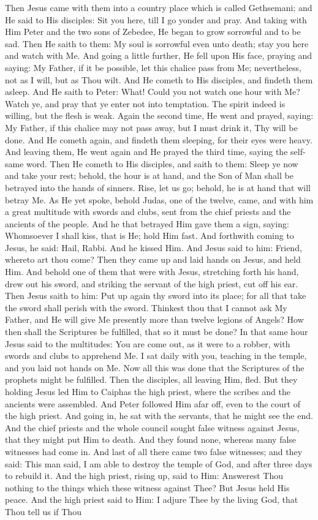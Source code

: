 {{Then Jesus came with them into a country place which is called Gethsemani; and He said to His disciples: Sit you here, till I go yonder and pray. And taking with Him Peter and the two sons of Zebedee, He began to grow sorrowful and to be sad. Then He saith to them: My soul is sorrowful even unto death; stay you here and watch with Me. And going a little further, He fell upon His face, praying and saying: My Father, if it be possible, let this chalice pass from Me; nevertheless, not as I will, but as Thou wilt. And He cometh to His disciples, and findeth them asleep. And He saith to Peter: What! Could you not watch one hour with Me? Watch ye, and pray that ye enter not into temptation. The spirit indeed is willing, but the flesh is weak. Again the second time, He went and prayed, saying: My Father, if this chalice may not pass away, but I must drink it, Thy will be done. And He cometh again, and findeth them sleeping, for their eyes were heavy. And leaving them, He went again and He prayed the third time, saying the self-same word. Then He cometh to His disciples, and saith to them: Sleep ye now and take your rest; behold, the hour is at hand, and the Son of Man shall be betrayed into the hands of sinners. Rise, let us go; behold, he is at hand that will betray Me.  As He yet spoke, behold Judas, one of the twelve, came, and with him a great multitude with swords and clubs, sent from the chief priests and the ancients of the people. And he that betrayed Him gave them a sign, saying: Whomsoever I shall kiss, that is He; hold Him fast. And forthwith coming to Jesus, he said: Hail, Rabbi. And he kissed Him. And Jesus said to him: Friend, whereto art thou come? Then they came up and laid hands on Jesus, and held Him. And behold one of them that were with Jesus, stretching forth his hand, drew out his sword, and striking the servant of the high priest, cut off his ear. Then Jesus saith to him: Put up again thy sword into its place; for all that take the sword shall perish with the sword. Thinkest thou that I cannot ask My Father, and He will give Me presently more than twelve legions of Angels? How then shall the Scriptures be fulfilled, that so it must be done? In that same hour Jesus said to the multitudes: You are come out, as it were to a robber, with swords and clubs to apprehend Me. I sat daily with you, teaching in the temple, and you laid not hands on Me. Now all this was done that the Scriptures of the prophets might be fulfilled. Then the disciples, all leaving Him, fled. But they holding Jesus led Him to Caiphas the high priest, where the scribes and the ancients were assembled. And Peter followed Him afar off, even to the court of the high priest. And going in, he sat with the servants, that he might see the end. And the chief priests and the whole council sought false witness against Jesus, that they might put Him to death. And they found none, whereas many false witnesses had come in. And last of all there came two false witnesses; and they said: This man said, I am able to destroy the temple of God, and after three days to rebuild it. And the high priest, rising up, said to Him: Answerest Thou nothing to the things which these witness against Thee? But Jesus held His peace. And the high priest said to Him: I adjure Thee by the living God, that Thou tell us if Thou }}
